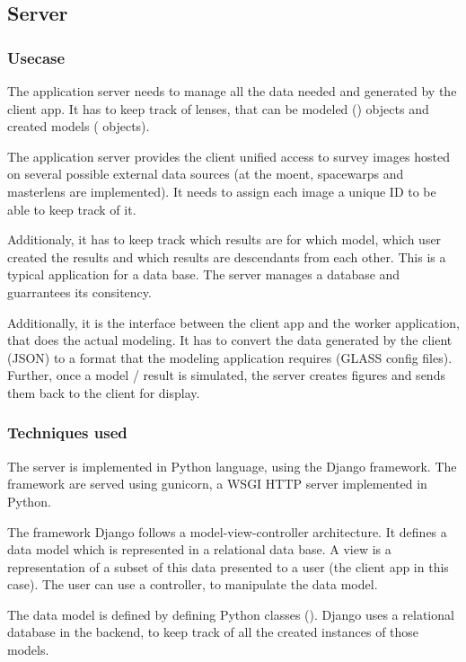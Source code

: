 \subsection{Server}
\label{sec:server}

\subsubsection{Usecase}
The application server needs to manage all the data needed and generated by the client app.
It has to keep track of lenses, that can be modeled () objects and created models ( objects).

The application server provides the client unified access to survey images hosted on several possible external data sources (at the moent, spacewarps and masterlens are implemented). It needs to assign each image a unique ID to be able to keep track of it.

Additionaly, it has to keep track which results are for which model, which user created the results and which results are descendants from each other.
This is a typical application for a data base.
The server manages a database and guarrantees its consitency.

Additionally, it is the interface between the client app and the worker application, that does the actual modeling. It has to convert the data generated by the client (JSON) to a format that the modeling application requires (GLASS config files).
Further, once a model / result is simulated, the server creates figures and sends them back to the client for display.



\subsubsection{Techniques used}

The server is implemented in Python language, using the Django framework. The framework are served using gunicorn, a WSGI HTTP server implemented in Python.

The framework Django follows a model-view-controller architecture.
It defines a data model which is represented in a relational data base.
A view is a representation of a subset of this data presented to a user (the client app in this case).
The user can use a controller, to manipulate the data model.

The data model is defined by defining Python classes (). Django uses a relational database in the backend, to keep track of all the created instances of those models.

